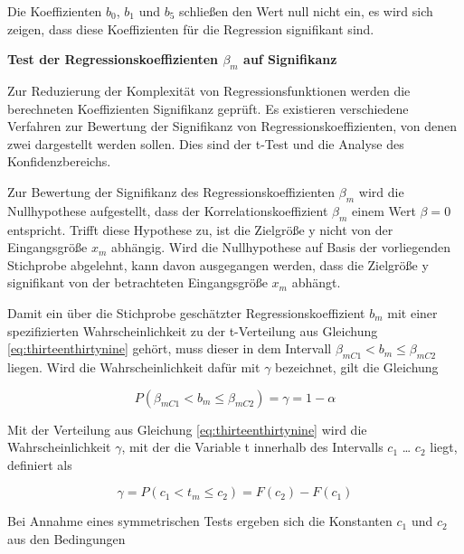 \noindent Die Koeffizienten $b_{0}$, $b_{1}$ und $b_{5}$ schlie{\ss}en den Wert null nicht ein, es wird sich zeigen, dass diese Koeffizienten f\"{u}r die Regression signifikant sind.\bigskip

{\selectfont
\noindent\textbf{Test der Regressionskoeffizienten $\beta_{m}$ auf Signifikanz}} \smallskip

\noindent Zur Reduzierung der Komplexit\"{a}t von Regressionsfunktionen werden die berechneten Koeffizienten Signifikanz gepr\"{u}ft. Es existieren verschiedene Verfahren zur Bewertung der Signifikanz von Regressionskoeffizienten, von denen zwei dargestellt werden sollen. Dies sind der t-Test und die Analyse des Konfidenzbereichs.\newline

\noindent Zur Bewertung der Signifikanz des Regressionskoeffizienten $\beta_{m}$ wird die Nullhypothese aufgestellt, dass der Korrelationskoeffizient $\beta_{m}$ einem Wert $\beta = 0$ entspricht. Trifft diese Hypothese zu, ist die Zielgr\"{o}{\ss}e y nicht von der Eingangsgr\"{o}{\ss}e $x_{m}$ abh\"{a}ngig. Wird die Nullhypothese auf Basis der vorliegenden Stichprobe abgelehnt, kann davon ausgegangen werden, dass die Zielgr\"{o}{\ss}e y signifikant von der betrachteten Eingangsgr\"{o}{\ss}e $x_{m}$ abh\"{a}ngt.\newline

\noindent Damit ein \"{u}ber die Stichprobe gesch\"{a}tzter Regressionskoeffizient $b_{m}$ mit einer spezifizierten Wahrscheinlichkeit zu der t-Verteilung aus Gleichung \eqref{eq:thirteenthirtynine} geh\"{o}rt, muss dieser in dem Intervall $\beta_{mC1} < b_{m} \leq \beta_{mC2}$ liegen. Wird die Wahrscheinlichkeit daf\"{u}r mit $\gamma$ bezeichnet, gilt die Gleichung

\begin{equation}\label{eq:thirteenfourtynine}
P\left(\beta _{mC1} <b_{m} \le \beta _{mC2} \right)=\gamma =1-\alpha
\end{equation}

\noindent Mit der Verteilung aus Gleichung \eqref{eq:thirteenthirtynine} wird die Wahrscheinlichkeit $\gamma$, mit der die Variable t innerhalb des Intervalls $c_{1}$ {\dots} $c_{2}$ liegt, definiert als

\begin{equation}\label{eq:thirteenfifty}
\gamma =P(c_{1} <t_{m} \le c_{2})=F(c_{2} )-F(c_{1})
\end{equation}

\noindent Bei Annahme eines symmetrischen Tests ergeben sich die Konstanten $c_{1}$ und $c_{2}$ aus den Bedingungen

